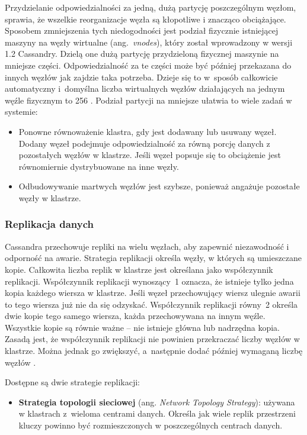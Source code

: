 Przydzielanie odpowiedzialności za jedną, dużą partycję poszczególnym węzłom, sprawia, że wszelkie reorganizacje węzła są kłopotliwe i znacząco obciążające.
Sposobem zmniejszenia tych niedogodności jest podział fizycznie istniejącej maszyny na węzły wirtualne (ang.~\textit{vnodes}), który został wprowadzony w wersji 1.2 Cassandry.
Dzielą one dużą partycję przydzieloną fizycznej maszynie na mniejsze części.
Odpowiedzialność za te części może być później przekazana do innych węzłów jak zajdzie taka potrzeba.
Dzieje się to w~sposób całkowicie automatyczny i~domyślna liczba wirtualnych węzłów działających na jednym węźle fizycznym to 256 \cite{virtualNodes}.
Podział partycji na mniejsze ułatwia to wiele zadań w systemie:
\begin{itemize}
    \item Ponowne równoważenie klastra, gdy jest dodawany lub usuwany węzeł.
    Dodany węzeł podejmuje odpowiedzialność za równą porcję danych z pozostałych węzłów w klastrze.
    Jeśli węzeł popsuje się to obciążenie jest równomiernie dystrybuowane na inne węzły.
    \item Odbudowywanie martwych węzłów jest szybsze, ponieważ angażuje pozostałe węzły w klastrze.
\end{itemize}

\subsubsection{Replikacja danych}

Cassandra przechowuje repliki na wielu węzłach, aby zapewnić niezawodność i odporność na awarie.
Strategia replikacji określa węzły, w których są umieszczane kopie.
Całkowita liczba replik w klastrze jest określana jako współczynnik replikacji.
Współczynnik replikacji wynoszący~1 oznacza, że istnieje tylko jedna kopia każdego wiersza w klastrze.
Jeśli węzeł przechowujący wiersz ulegnie awarii to tego wiersza już nie da się odzyskać.
Współczynnik replikacji równy~2 określa dwie kopie tego samego wiersza, każda przechowywana na innym węźle.
Wszystkie kopie są równie ważne -- nie istnieje główna lub nadrzędna kopia.
Zasadą jest, że współczynnik replikacji nie powinien przekraczać liczby węzłów w klastrze.
Można jednak go zwiększyć, a~następnie dodać później wymaganą liczbę węzłów \cite{cassandraDataReplication}.

Dostępne są dwie strategie replikacji:
\begin{itemize}
    \item \textbf{Strategia topologii sieciowej} (ang. \textit{Network Topology Strategy}): używana w klastrach z~wieloma centrami danych.
    Określa jak wiele replik przestrzeni kluczy powinno być rozmieszczonych w poszczególnych centrach danych.
\end{itemize}

